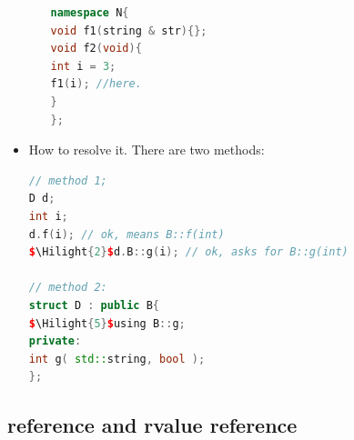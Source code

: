 \documentclass[a4paper,12pt,twoside]{book}
\newcommand{\Hilight}[1]{\makebox[0pt][l]{\color{yellow}\rule[-3pt]{#1em}{11pt}}}
\begin{document}
\begin{itemize}
\begin{enumerate}
\begin{lstlisting}[frame=single, language=c++]
namespace N{
void f1(string & str){};
void f2(void){
int i = 3;
f1(i); //here.
}
};
\end{lstlisting}
\end{enumerate}

\item How to resolve it.  There are two methods:
\begin{lstlisting}[frame=single, language=c++, mathescape=true]
// method 1;
D d;
int i;
d.f(i); // ok, means B::f(int)
$\Hilight{2}$d.B::g(i); // ok, asks for B::g(int)

// method 2:
struct D : public B{
$\Hilight{5}$using B::g;
private:
int g( std::string, bool );
};

\end{lstlisting}

\end{itemize}

\subsection{reference and rvalue reference}
\end{document}
